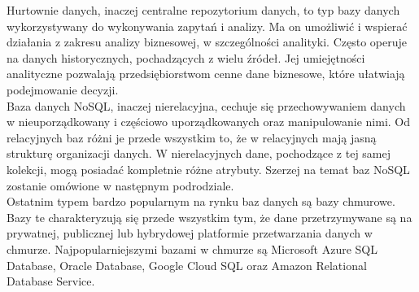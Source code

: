 \documentclass[12pt]{article}
\begin{document}
\begin{sloppypar}
{{  Hurtownie danych, inaczej centralne repozytorium danych, to typ bazy danych wykorzystywany do wykonywania zapytań i analizy. 
  Ma on umożliwić i wspierać działania z zakresu analizy biznesowej, w szczególności analityki. Często operuje na danych historycznych, pochadzących z wielu źródeł. 
  Jej umiejętności analityczne pozwalają przedsiębiorstwom cenne dane biznesowe, które ułatwiają podejmowanie decyzji.\cite{oracle-warehouse}\\
  Baza danych NoSQL, inaczej nierelacyjna, cechuje się przechowywaniem danych w nieuporządkowany i częściowo uporządkowanych oraz manipulowanie nimi. Od relacyjnych baz
  różni je przede wszystkim to, że w relacyjnych mają jasną strukturę organizacji danych. W nierelacyjnych dane, pochodzące z tej samej kolekcji, mogą posiadać 
  kompletnie różne atrybuty. Szerzej na temat baz NoSQL zostanie omówione w następnym podrodziale.\\
  Ostatnim typem bardzo popularnym na rynku baz danych są bazy chmurowe. Bazy te charakteryzują się przede wszystkim tym, że dane przetrzymywane są na prywatnej,
  publicznej lub hybrydowej platformie przetwarzania danych w chmurze. 
  Najpopularniejszymi bazami w chmurze są Microsoft Azure SQL Database, Oracle Database, Google Cloud SQL oraz Amazon Relational Database Service.
}
}
\end{sloppypar}
\end{document}
